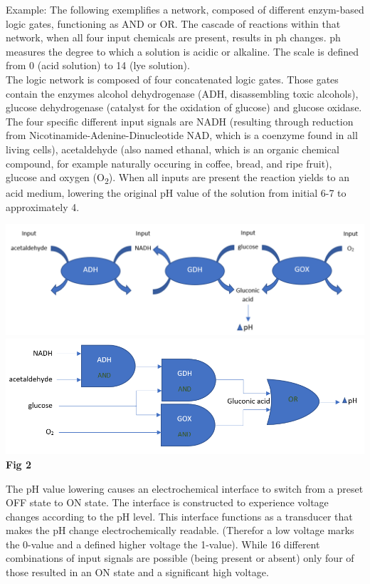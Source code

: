 \documentclass[runningheads]{llncs}
\begin{document}
		Example: The following exemplifies a network, composed of different enzym-based logic gates, functioning as AND or OR. The cascade of reactions within that network, when all four input chemicals are present, results in ph changes. ph measures the degree to which a solution is acidic or alkaline. The scale is defined from 0 (acid solution) to 14 (lye solution).\\
		The logic network is composed of four concatenated logic gates. Those gates contain the enzymes alcohol dehydrogenase (ADH, disassembling toxic alcohols), glucose dehydrogenase (catalyst for the oxidation of glucose) and glucose oxidase. The four specific different input signals are NADH (resulting through reduction from Nicotinamide-Adenine-Dinucleotide NAD, which is a coenzyme found in all living cells),  acetaldehyde (also named ethanal, which is an organic chemical compound, for example naturally occuring in coffee, bread, and ripe fruit), glucose and oxygen (O\textsubscript{2}).
	 	When all inputs are present the reaction yields to an acid medium, lowering the original pH value of the solution from initial 6-7 to approximately 4. \cite{original}\cite{chemie}
	\begin{center}
		\includegraphics[scale= 0.38]{pics/network1.png}  
		\includegraphics[scale= 0.4]{pics/network2.png} \\
	\textbf{Fig 2} 
		\end{center}
		The pH value lowering causes an electrochemical interface to switch from a preset OFF state to ON state. The interface is constructed to experience voltage changes according to the pH level. This interface functions as a transducer that makes the pH change electrochemically readable. (Therefor a low voltage marks the 0-value and a defined higher voltage the 1-value). While 16 different combinations of input signals are possible (being present or absent) only four of those resulted in an ON state and a significant high voltage. \cite{original}
		
\end{document}
